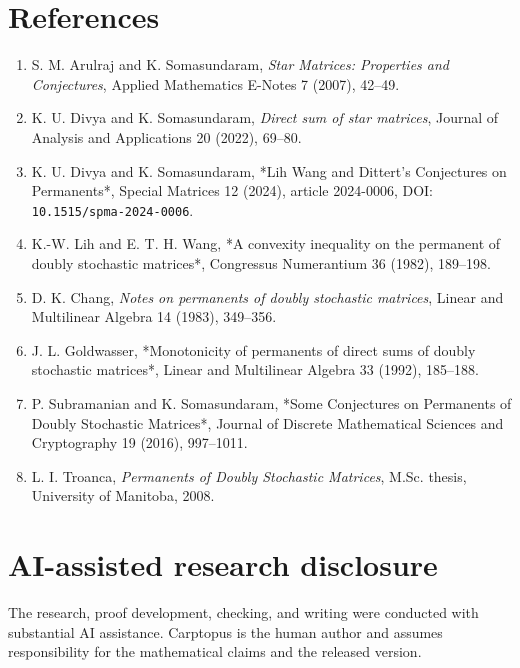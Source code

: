 \documentclass[11pt]{article}
\begin{document}
\section*{References}
\begin{enumerate}


\item S. M. Arulraj and K. Somasundaram, \emph{Star Matrices: Properties and Conjectures},
   Applied Mathematics E-Notes 7 (2007), 42--49.
\item K. U. Divya and K. Somasundaram, \emph{Direct sum of star matrices}, Journal of
   Analysis and Applications 20 (2022), 69--80.
\item K. U. Divya and K. Somasundaram, *Lih Wang and Dittert's Conjectures on
   Permanents*, Special Matrices 12 (2024), article 2024-0006,
   DOI: \texttt{10.\allowbreak{}1515/\allowbreak{}spma-\allowbreak{}2024-\allowbreak{}0006}.
\item K.-W. Lih and E. T. H. Wang, *A convexity inequality on the permanent of doubly
   stochastic matrices*, Congressus Numerantium 36 (1982), 189--198.
\item D. K. Chang, \emph{Notes on permanents of doubly stochastic matrices}, Linear and
   Multilinear Algebra 14 (1983), 349--356.
\item J. L. Goldwasser, *Monotonicity of permanents of direct sums of doubly stochastic
   matrices*, Linear and Multilinear Algebra 33 (1992), 185--188.
\item P. Subramanian and K. Somasundaram, *Some Conjectures on Permanents of Doubly
   Stochastic Matrices*, Journal of Discrete Mathematical Sciences and Cryptography
   19 (2016), 997--1011.
\item L. I. Troanca, \emph{Permanents of Doubly Stochastic Matrices}, M.Sc. thesis,
   University of Manitoba, 2008.

\end{enumerate}

\section*{AI-assisted research disclosure}


The research, proof development, checking, and writing were conducted with substantial
AI assistance.  Carptopus is the human author and assumes responsibility for the
mathematical claims and the released version.
\end{document}
